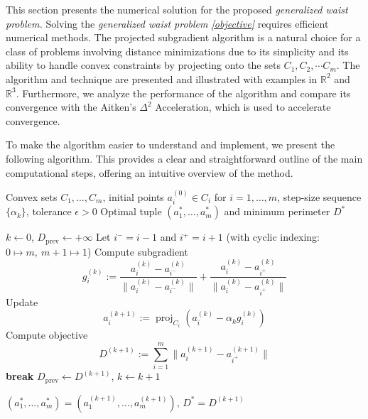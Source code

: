 \documentclass[12pt]{article}
\theoremstyle{plain}
\theoremstyle{definition}
\begin{document}
This section presents the numerical solution for the proposed \textit{generalized waist problem.} Solving the \textit{ generalized waist problem \eqref{objective}} requires efficient numerical methods. The projected subgradient algorithm is a natural choice for a class of problems involving distance minimizations due to its simplicity and its ability to handle convex constraints by projecting onto the sets \(C_1, C_2, \cdots C_m\). The algorithm and technique are presented and illustrated with examples in \(\mathbb{R}^2\) and \(\mathbb{R}^3\). Furthermore, we analyze the performance of the algorithm and compare its convergence with the Aitken's \(\Delta^2\) Acceleration, which is used to accelerate convergence.

To make the algorithm easier to understand and implement, we present the following algorithm. This provides a clear and straightforward outline of the main computational steps, offering an intuitive overview of the method.




\begin{algorithm}[H]
	\caption{Projected Subgradient Descent for the generalized waist problem}
	\label{alg:psd_algorithm}
	\begin{algorithmic}[1]
		\REQUIRE Convex sets $C_1,\dots,C_m$, initial points $a_i^{(0)}\in C_i$ for $i=1,\dots,m$, step-size sequence $\{\alpha_k\}$, tolerance $\epsilon > 0$
		\ENSURE Optimal tuple $(a_1^*,\dots,a_m^*)$ and minimum perimeter $D^*$
		
		\STATE $k \gets 0$, $D_{\mathrm{prev}} \gets +\infty$
		\REPEAT
		\STATE Let $i^- = i - 1$ and $i^+ = i + 1$ (with cyclic indexing: $0 \mapsto m,\ m+1 \mapsto 1$)
		\STATE Compute subgradient
		\[
		g_i^{(k)} := \frac{a_i^{(k)} - a_{i^-}^{(k)}}{\|a_i^{(k)} - a_{i^-}^{(k)}\|}
		+ \frac{a_i^{(k)} - a_{i^+}^{(k)}}{\|a_i^{(k)} - a_{i^+}^{(k)}\|}
		\]
		\ENDFOR
		\STATE Update
		\[
		a_i^{(k+1)} := \operatorname{proj}_{C_i}\left(a_i^{(k)} - \alpha_k g_i^{(k)}\right)
		\]
		\ENDFOR
		\STATE Compute objective
		\[
		D^{(k+1)} := \sum_{i=1}^m \|a_i^{(k+1)} - a_{i^+}^{(k+1)}\|
		\]
		\STATE \textbf{break}
		\ENDIF
		\STATE $D_{\mathrm{prev}} \gets D^{(k+1)}$, $k \gets k + 1$
		
		\RETURN $(a_1^*, \dots, a_m^*) = (a_1^{(k+1)}, \dots, a_m^{(k+1)})$, $D^* = D^{(k+1)}$
	\end{algorithmic}
\end{algorithm}
\end{document}
